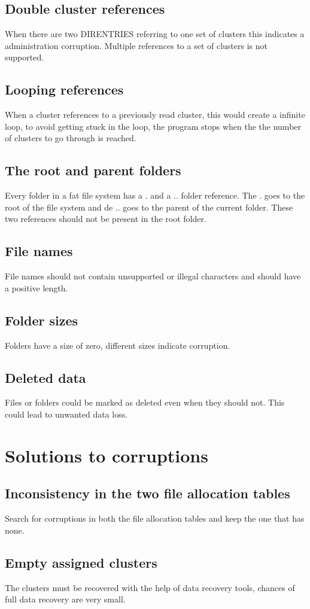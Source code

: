 \documentclass[pdftex,12pt,a4paper]{article}
\begin{document}
\subsection{Double cluster references}
When there are two DIRENTRIES referring to one set of clusters this indicates a administration corruption. Multiple references to a set of clusters is not supported.
\subsection{Looping references}
When a cluster references to a previously read cluster, this would create a infinite loop, to avoid getting stuck in the loop, the program stops when the the number of clusters to go through is reached.
\subsection{The root and parent folders}
Every folder in a fat file system has a . and a .. folder reference. The . goes to the root of the file system and de .. goes to the parent of the current folder. These two references should not be present in the root folder.
\subsection{File names}
File names should not contain unsupported or illegal characters and should have a positive length.
\subsection{Folder sizes}
Folders have a size of zero, different sizes indicate corruption.
\subsection{Deleted data}
Files or folders could be marked as deleted even when they should not. This could lead to unwanted data loss. 

\section{Solutions to corruptions}
\subsection{Inconsistency in the two file allocation tables}
Search for corruptions in both the file allocation tables and keep the one that has none.
\subsection{Empty assigned clusters}
The clusters must be recovered with the help of data recovery tools, chances of full data recovery are very small.
\end{document}
